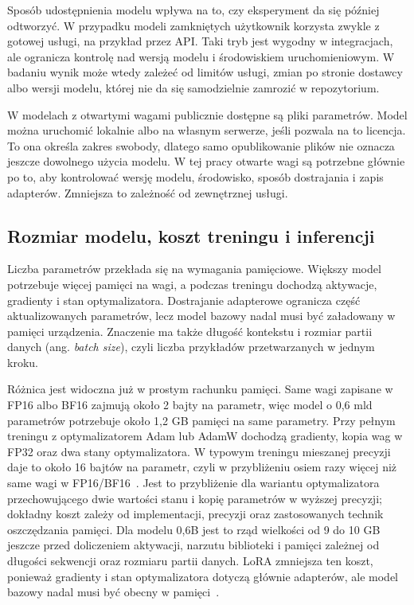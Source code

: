 Sposób udostępnienia modelu wpływa na to, czy eksperyment da się później
odtworzyć. W przypadku modeli zamkniętych użytkownik korzysta zwykle z gotowej
usługi, na przykład przez API. Taki tryb jest wygodny w integracjach, ale
ogranicza kontrolę nad wersją modelu i środowiskiem uruchomieniowym. W badaniu
wynik może wtedy zależeć od limitów usługi, zmian po stronie dostawcy albo
wersji modelu, której nie da się samodzielnie zamrozić w repozytorium.

W modelach z otwartymi wagami publicznie dostępne są pliki parametrów. Model
można uruchomić lokalnie albo na własnym serwerze, jeśli pozwala na to licencja.
To ona określa zakres swobody, dlatego samo opublikowanie plików nie oznacza
jeszcze dowolnego użycia modelu. W tej pracy otwarte wagi są potrzebne głównie
po to, aby kontrolować wersję modelu, środowisko, sposób dostrajania i zapis
adapterów. Zmniejsza to zależność od zewnętrznej usługi.

\subsection{Rozmiar modelu, koszt treningu i inferencji}

Liczba parametrów przekłada się na wymagania pamięciowe. Większy model potrzebuje
więcej pamięci na wagi, a podczas treningu dochodzą aktywacje, gradienty i stan
optymalizatora. Dostrajanie adapterowe ogranicza część aktualizowanych
parametrów, lecz model bazowy nadal musi być załadowany w pamięci urządzenia.
Znaczenie ma także długość kontekstu i rozmiar partii danych (ang. \emph{batch size}),
czyli liczba przykładów przetwarzanych w jednym kroku.

Różnica jest widoczna już w prostym rachunku pamięci. Same wagi zapisane w
FP16 albo BF16 zajmują około 2 bajty na parametr, więc model o 0,6 mld
parametrów potrzebuje około 1,2 GB pamięci na same parametry. Przy pełnym
treningu z optymalizatorem Adam lub AdamW dochodzą gradienty, kopia wag w FP32
oraz dwa stany optymalizatora. W typowym treningu mieszanej precyzji daje to
około 16 bajtów na parametr, czyli w przybliżeniu osiem razy więcej niż same
wagi w FP16/BF16~\autocite{micikevicius-mixed-precision-training,rajbhandari-zero}.
Jest to przybliżenie dla wariantu optymalizatora przechowującego dwie wartości
stanu i kopię parametrów w wyższej precyzji; dokładny koszt zależy od
implementacji, precyzji oraz zastosowanych technik oszczędzania pamięci.
Dla modelu 0,6B jest to rząd wielkości od 9 do 10 GB jeszcze przed doliczeniem
aktywacji, narzutu biblioteki i pamięci zależnej od długości sekwencji oraz
rozmiaru partii danych. LoRA zmniejsza ten koszt, ponieważ gradienty i stan
optymalizatora dotyczą głównie adapterów, ale model bazowy nadal musi być
obecny w pamięci~\autocite{hu-lora}.

